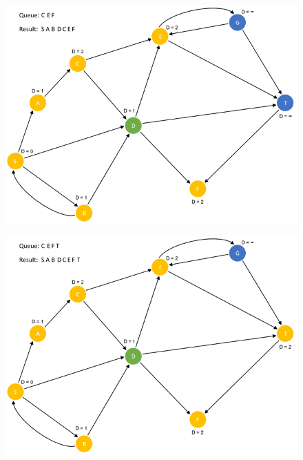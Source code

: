 \documentclass{article}
\begin{document}
\begin{figure}[H]
\centering
\includegraphics[scale=0.6]{images/Q4/10.png}
\end{figure}

\begin{figure}[H]
\centering
\includegraphics[scale=0.6]{images/Q4/11.png}
\end{figure}
\end{document}
